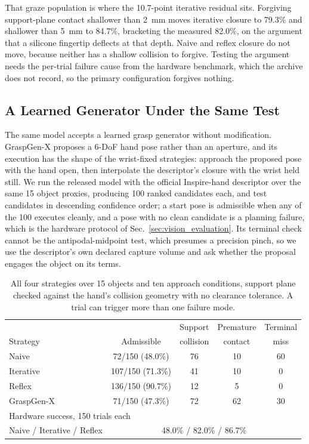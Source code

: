 That graze population is where the 10.7-point iterative residual sits. Forgiving
support-plane contact shallower than \SI{2}{\milli\metre} moves iterative closure
to 79.3\% and shallower than \SI{5}{\milli\metre} to 84.7\%, bracketing the
measured 82.0\%, on the argument that a silicone fingertip deflects at that depth.
Naive and reflex closure do not move, because neither has a shallow collision to
forgive. Testing the argument needs the per-trial failure cause from the hardware
benchmark, which the archive does not record, so the primary configuration
forgives nothing.

\subsection{A Learned Generator Under the Same Test}
\label{sec:ggx_reachability_v2}

The same model accepts a learned grasp generator without modification.
GraspGen-X proposes a 6-DoF hand pose rather than an aperture, and its execution
has the shape of the wrist-fixed strategies: approach the proposed pose with the
hand open, then interpolate the descriptor's closure with the wrist held still.
We run the released model with the official Inspire-hand descriptor over the same
15 object proxies, producing 100 ranked candidates each, and test candidates in
descending confidence order; a start pose is admissible when any of the 100
executes cleanly, and a pose with no clean candidate is a planning failure, which
is the hardware protocol of Sec.~\ref{sec:vision_evaluation}. Its
terminal check cannot be the antipodal-midpoint test, which presumes a precision
pinch, so we use the descriptor's own declared capture volume and ask whether the
proposal engages the object on its terms.

\begin{table}[t]
  \centering
  \caption{All four strategies over 15 objects and ten approach conditions,
  support plane checked against the hand's collision geometry with no clearance
  tolerance. A trial can trigger more than one failure mode.}
  \label{tab:ggx_admissibility}
  \setlength{\tabcolsep}{4pt}
  \begin{tabular}{lcccc}
    \toprule
    & & Support & Premature & Terminal \\
    Strategy & Admissible & collision & contact & miss \\
    \midrule
    Naive       & 72/150 (48.0\%)  & 76 & 10 & 60 \\
    Iterative   & 107/150 (71.3\%) & 41 & 10 &  0 \\
    Reflex      & 136/150 (90.7\%) & 12 &  5 &  0 \\
    GraspGen-X  & 71/150 (47.3\%)  & 72 & 62 & 30 \\
    \midrule
    \multicolumn{2}{l}{Hardware success, 150 trials each} \\
    Naive / Iterative / Reflex & \multicolumn{4}{c}{48.0\% / 82.0\% / 86.7\%} \\
    \bottomrule
  \end{tabular}
\end{table}

